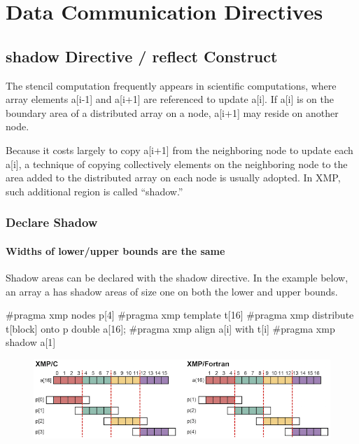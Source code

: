 \section{Data Communication Directives}

\subsection{{\bf shadow} Directive / {\bf reflect} Construct}

The stencil computation frequently appears in scientific computations,
where array elements a[i-1] and a[i+1] are referenced to update a[i]. If
a[i] is on the boundary area of a distributed array on a node, a[i+1]
may reside on another node.

Because it costs largely to copy a[i+1] from the neighboring node to
update each a[i], a technique of copying collectively elements on the
neighboring node to the area added to the distributed array on each node
is usually adopted. In XMP, such additional region is called “shadow.”

\subsubsection{Declare Shadow}

\paragraph{Widths of lower/upper bounds are the same}

Shadow areas can be declared with the shadow directive. In the example
below, an array a has shadow areas of size one on both the lower and
upper bounds.

\begin{XCexample}
#pragma xmp nodes p[4]
#pragma xmp template t[16]
#pragma xmp distribute t[block] onto p
double a[16];
#pragma xmp align a[i] with t[i]
#pragma xmp shadow a[1]
\end{XCexample}


\begin{figure}
  \centering
  \includegraphics{figs/shadow.png}
\end{figure}

